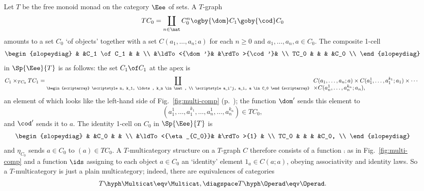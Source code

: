 \begin{example}	%
%
%
Let $T$ be the free monoid monad on the category $\Eee$ of sets.  A
$T$-graph
\[
TC_0 = \coprod_{n\in\nat}C_0^n \ogby{\dom} C_1 \goby{\cod} C_0
\]
amounts to a set $C_0$ `of objects' together with a set $C(a_1, \ldots,
a_n; a)$ for each $n\geq 0$ and $a_1, \ldots, a_n, a \in C_0$.  
The composite 1-cell
\[
\begin{slopeydiag}
           &         &C_1 \of C_1      &          &           \\
           &\ldTo<{\dom'}&             &\rdTo>{\cod'}&        \\
TC_0       &         &                 &          &C_0        \\
\end{slopeydiag}
\]
in $\Sp{\Eee}{T}$ is as follows: the set $C_1 \of C_1$ at the apex is 
\[
C_1 \times_{TC_0} TC_1	
=	
\coprod_{%
\begin{scriptarray}
\scriptstyle
n, k_1, \ldots, k_n \in\nat,	\\
\scriptstyle
a_i^j, a_i, a \in C_0
\end{scriptarray}}	
\begin{array}[t]{l}
C(a_1, \ldots, a_n; a) \times
C(a_1^1, \ldots, a_1^{k_1}; a_1) \times\cdots
\\
\times C(a_n^1, \ldots, a_n^{k_n}; a_n),
\end{array}
\]
an element of which looks like the left-hand side of
Fig.~\ref{fig:multi-comp} (p.~\pageref{fig:multi-comp}); the function
$\dom'$ sends this element to 
\[
(a_1^1, \ldots, a_1^{k_1}, \ldots, a_n^1, \ldots, a_n^{k_n}) \in TC_0,
\]
and $\cod'$ sends it to $a$.  The identity 1-cell on $C_0$ in
$\Sp{\Eee}{T}$ is 
\[
\begin{slopeydiag}
           &         &C_0           &          &           \\
           &\ldTo<{\eta_{C_0}}&     &\rdTo>{1} &           \\
TC_0       &         &              &          &C_0,       \\
\end{slopeydiag}
\]
and $\eta_{C_0}$ sends $a\in C_0$ to $(a) \in TC_0$.  A
$T$-multicategory structure on a $T$-graph $C$ therefore consists of a
function $\comp$ as in Fig.~\ref{fig:multi-comp} and a function $\ids$
assigning to each object $a\in C_0$ an `identity' element $1_a \in C(a;a)$,
obeying associativity and identity laws.  So a $T$-multicategory is just a
plain%
%
%
multicategory; indeed, there are equivalences of categories
\[
T\hyph\Multicat \eqv \Multicat, 
\diagspace
T\hyph\Operad \eqv \Operad.
%
\index{operad!generalized operad@as generalized operad}
%
\]
\end{example}

